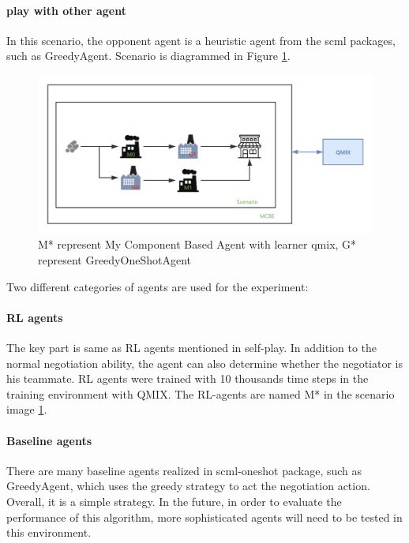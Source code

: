 \paragraph{play with other agent} In this scenario, the opponent agent is a heuristic agent from the scml packages, such as GreedyAgent.
Scenario is diagrammed in Figure \ref{fig:scenario-oneshot-scml-play-with-greedy}.
\begin{figure}[htbp]
\centering
\includegraphics[width=1.0\textwidth]{./images/scenario-oneshot-scml-play-with-greedy.png}
\caption{M* represent My Component Based Agent with learner \gls{qmix}, G* represent GreedyOneShotAgent}
\label{fig:scenario-oneshot-scml-play-with-greedy}
\end{figure}

Two different categories of agents are used for the experiment:

\paragraph{RL agents} The key part is same as RL agents mentioned in self-play. In addition to the normal negotiation ability, the agent can also determine whether the negotiator is his teammate. RL agents were trained with 10 thousands time steps in the training environment with QMIX. The RL-agents are named M* in the scenario image \ref{fig:scenario-oneshot-scml-play-with-greedy}.
\paragraph{Baseline agents} There are many baseline agents realized in scml-oneshot package, such as GreedyAgent, which uses the greedy strategy to act the negotiation action. Overall, it is a simple strategy. In the future, in order to evaluate the performance of this algorithm, more sophisticated agents will need to be tested in this environment. 

